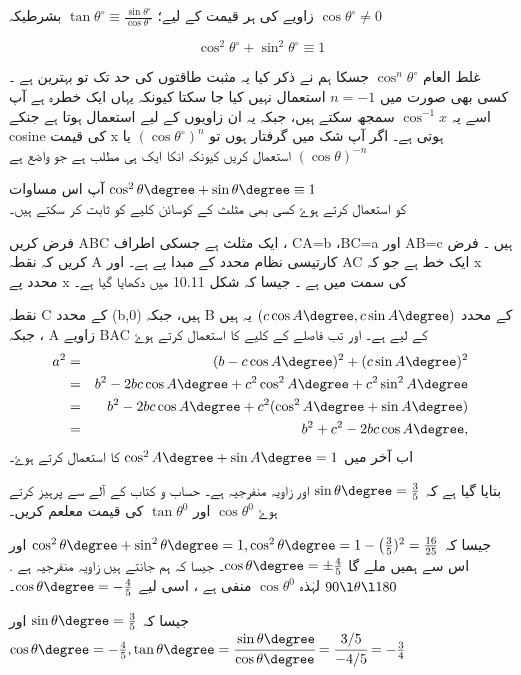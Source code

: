 زاویے کی ہر قیمت کے لیے؛
\( \tan\theta^{\circ}\equiv\frac{\sin\theta^{\circ}}{\cos\theta^{\circ}} \) 
بشرطیکہ \( \cos\theta^{\circ} \neq 0 \) 

\[ \cos^{2}\theta^{\circ}+\sin^{2}\theta^{\circ}\equiv1 \] 

غلط العام  \( \cos^{n}\theta^{\circ} \)  جسکا ہم نے ذکر کیا 
یہ مثبت طاقتوں کی حد تک تو بہترین ہے ۔ کسی بھی صورت میں \( n=-1 \) استعمال نہیں کیا جا سکتا کیونکہ یہاں ایک خطرہ ہے آپ اسے یہ 
\( \cos^{-1}x \) 
سمجھ سکتے ہیں، جبکہ یہ ان زاویوں کے لیے استعمال ہوتا ہے جنکے cosine کی قیمت   x
 ہوتی ہے۔ اگر آپ شک میں گرفتار ہوں تو \( \left( \cos\theta^{\circ} \right)^{n} \)  یا 
\( \left(\cos\theta\right)^{-n} \) 
استعمال کریں کیونکہ انکا ایک ہی مطلب ہے جو واضع ہے

آپ اس مساوات \(\cos^2\theta\degree+\sin\theta\degree \equiv1\)\\ کو استعمال کرتے ہوۓ کسی بھی مثلث کے کوسائن کلیے کو ثابت کر سکتے ہیں۔

فرض کریں ABC ایک  مثلث ہے جسکی اطراف ،   CA=b  ،BC=a
اور  AB=c
ہیں ۔ فرض کریں کہ نقطہ A کارتیسی نظام محدد کے مبدا پے ہے۔ اور   AC  ایک خط ہے جو کہ x محدد پے x کی  سمت میں ہے ۔ جیسا کہ شکل 10.11 میں دکھایا گیا ہے۔ 

نقطہ   C کے محدد  (b,0) ہیں، جبکہ B کے محدد  \((c\cos A\degree,c\sin A\degree)\)    یہ ہیں ، جبکہ A  زاویے   BAC  کے لیے ہے۔ اور تب فاصلے کے کلیے کا استعمال کرتے ہوۓ  
\begin{eqnarray*}
a^{2} &=&(b-c\cos A\degree)^2+(c\sin A\degree)^2\\ 
&=& b^2-2bc\cos A\degree+c^2 \cos^2 A\degree +c^2\sin^2 A\degree\\
&=&b^2-2bc\cos A\degree +c^2 (\cos^2 A\degree+\sin A\degree)\\
&=&b^2+c^2-2bc\cos A\degree,
\end{eqnarray*}
 اب آخر میں \(\cos^2 A\degree+\sin A\degree=1\) کا استعمال کرتے ہوۓ۔

 بتایا گیا ہے کہ \(\sin\theta\degree=\frac{3}{5}\) اور زاویہ منفرجیہ ہے۔ حساب و کتاب کے آلے سے  پرہیز کرتے ہوۓ \( \cos \theta^{0}\)  اور   \( \tan \theta^{0}\) کی قیمت معلعم کریں۔

جیسا کہ \(\cos^2\theta\degree+\sin^2\theta\degree = 1, \cos^2\theta\degree=1-\big(\frac{3}{5})^2=\frac{16}{25}\) اور اس سے ہمیں ملے گا  \(\cos\theta\degree=\pm\frac{4}{5}\)۔ جیسا کہ ہم جانتے ہیں زاویہ منفرجیہ ہے . \( 90\l \theta \l 180\) لہٰذہ \( \cos \theta^{0}\) منفی ہے ، اسی لیے \(\cos\theta\degree=-\frac{4}{5}\)۔

جیسا کہ \(\sin\theta\degree=\frac{3}{5}\) اور \(\cos\theta\degree=-\frac{4}{5},\tan\theta\degree=\cfrac{\sin\theta\degree}{\cos\theta\degree}=\cfrac{3/5}{-4/5}=-\frac{3}{4}\)

